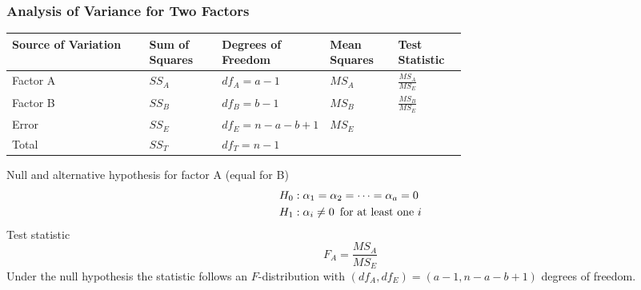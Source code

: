 \documentclass[11pt]{article}
\theoremstyle{definition}
\begin{document}
\subsubsection{Analysis of Variance for Two Factors}
\begingroup
\renewcommand{\arraystretch}{1.8}
\begin{tabularx}{\linewidth}{X | p{0.16\linewidth} p{0.2\linewidth} p{0.15\linewidth} p{0.15\linewidth}}
	Source of Variation & Sum of Squares & Degrees of Freedom & Mean Squares & Test Statistic\\
	\hline
	Factor A & $SS_A$ & $df_A = a-1$ & $MS_A$ & $\frac{MS_A}{MS_E}$\\
	Factor B & $SS_B$ & $df_B = b-1$ & $MS_B$ & $\frac{MS_B}{MS_E}$\\
	Error & $SS_E$ & $df_E = n-a-b+1$ & $MS_E$ & \\
	\hline
	Total & $SS_T$ & $df_T = n-1$ & &
\end{tabularx}
\endgroup
Null and alternative hypothesis for factor A (equal for B)
\begin{align*}
	H_0 &: \alpha_1=\alpha_2=\dots=\alpha_a=0\\
	H_1 &: \alpha_i\neq0\hspace*{0.5em}\text{for at least one $i$}
\end{align*}
Test statistic
\begin{equation*}
	F_A = \frac{MS_A}{MS_E}
\end{equation*}
Under the null hypothesis the statistic follows an $F$-distribution with $(df_A,df_E ) = (a - 1,n - a - b + 1)$ degrees of freedom.
\end{document}
